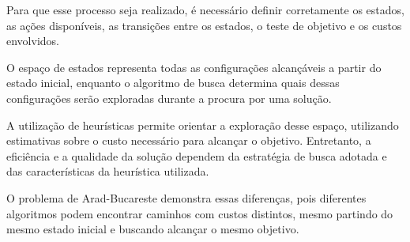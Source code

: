 Para que esse processo seja realizado, é necessário definir corretamente os estados, as ações disponíveis, as transições entre os estados, o teste de objetivo e os custos envolvidos.

O espaço de estados representa todas as configurações alcançáveis a partir do estado inicial, enquanto o algoritmo de busca determina quais dessas configurações serão exploradas durante a procura por uma solução.

A utilização de heurísticas permite orientar a exploração desse espaço, utilizando estimativas sobre o custo necessário para alcançar o objetivo. Entretanto, a eficiência e a qualidade da solução dependem da estratégia de busca adotada e das características da heurística utilizada.

O problema de Arad-Bucareste demonstra essas diferenças, pois diferentes algoritmos podem encontrar caminhos com custos distintos, mesmo partindo do mesmo estado inicial e buscando alcançar o mesmo objetivo.



